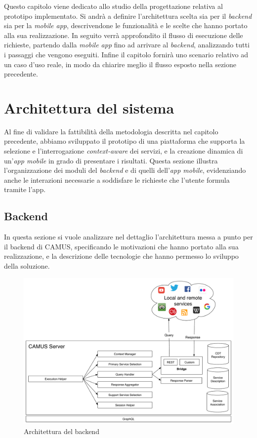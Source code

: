 Questo capitolo viene dedicato allo studio della progettazione relativa al prototipo implementato. Si andrà a definire l'architettura scelta sia per il \emph{backend} sia per la \emph{mobile app}, descrivendone le funzionalità e le scelte che hanno portato alla sua realizzazione. In seguito verrà approfondito il flusso di esecuzione delle richieste, partendo dalla \emph{mobile app} fino ad arrivare al \emph{backend}, analizzando tutti i passaggi che vengono eseguiti. Infine il capitolo fornirà uno scenario relativo ad un caso d'uso reale, in modo da chiarire meglio il flusso esposto nella sezione precedente.

\section{Architettura del sistema\label{sec:architettura-sistema}}

Al fine di validare la fattibilità della metodologia descritta nel capitolo precedente, abbiamo sviluppato il prototipo di una piattaforma che supporta la selezione e l'interrogazione \emph{context-aware} dei servizi, e la creazione dinamica di un'\textit{app mobile} in grado di presentare i risultati. Questa sezione illustra l'organizzazione dei moduli del \emph{backend} e di quelli dell'\emph{app mobile}, evidenziando anche le interazioni necessarie a soddisfare le richieste che l'utente formula tramite l'app.

\subsection{Backend\label{sec:architettura-backend}}

In questa sezione si vuole analizzare nel dettaglio l'architettura messa a punto per il backend di CAMUS, specificando le motivazioni che hanno portato alla sua realizzazione, e la descrizione delle tecnologie che hanno permesso lo sviluppo della soluzione.

\begin{figure}[ht]
	\centering
	\includegraphics[width=\textwidth]{4-progettazione-alto-livello/Immagini/camus-architecture-backend.pdf}
	\caption{Architettura del backend}\label{fig:architettura-backend}
\end{figure}

